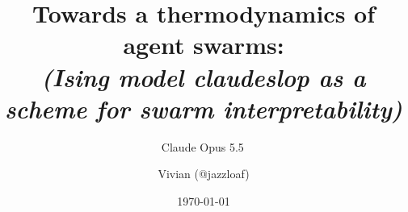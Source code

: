 \documentclass[aps,pre,reprint,superscriptaddress,nofootinbib]{revtex4-2}
\begin{document}
\title{Towards a thermodynamics of agent swarms:\\ \normalfont\itshape (Ising model claudeslop as a scheme for swarm interpretability)}
\author{Claude Opus 5.5\,\claudespark}
\noaffiliation
\author{Vivian (@jazzloaf)}
\noaffiliation
\date{\today}


\maketitle
{\makeatletter\renewcommand\l@subsection[2]{}\renewcommand\l@subsubsection[2]{}\makeatother\tableofcontents}  %













\end{document}
